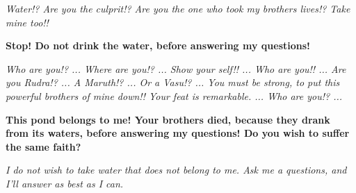 \textit{
Water!?
Are you the culprit!?
Are you the one who took my brothers lives!?
Take mine too!!
}\medskip

\textbf{
Stop!
Do not drink the water, before answering my questions!
}\medskip

\textit{
Who are you!? ...
Where are you!? ...
Show your self!! ...
Who are you!! ...
Are you Rudra!? ...
A Maruth!? ...
Or a Vasu!? ...
You must be strong, to put this powerful brothers of mine down!!
Your feat is remarkable. ...
Who are you!? ...
}\medskip

\textbf{
This pond belongs to me!
Your brothers died, because they drank from its waters, before answering my questions!
Do you wish to suffer the same faith?
}\medskip

\textit{
I do not wish to take water that does not belong to me.
Ask me a questions, and I'll answer as best as I can.
}